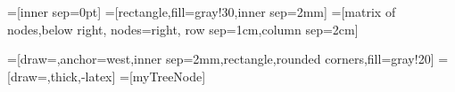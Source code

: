 \newcommand\easttowest[3][-latex]{\draw[very thick,#1](#2.east) to[out=0,in=180] (#3.west);}
\newcommand\easttonorth[3][-latex]{\draw[very thick,#1](#2.east) to[out=0,in=90] (#3.north);}
\newcommand\easttosouth[3][-latex]{\draw[very thick,#1](#2.east) to[out=0,in=270] (#3.south);}


\newcommand\westTowest[3][-latex]{\draw[very thick,#1](#2.west) to[out=180,in=180] (#3.west);}
\newcommand\westTonorth[3][-latex]{\draw[very thick,#1](#2.west) to[out=180,in=90] (#3.north);}
\newcommand{\mySection}[1]{\section*{\texttt{#1}}}

=[inner sep=0pt]
=[rectangle,fill=gray!30,inner sep=2mm]
=[matrix of nodes,below right,
nodes={right},                  %
row sep=1cm,column sep=2cm]

=[draw=\mycola,anchor=west,inner sep=2mm,rectangle,rounded corners,fill=gray!20]
=[draw=\mycola,thick,-latex]
=[myTreeNode]

\usepackage{simpsons}
\usepackage{cleveref}







